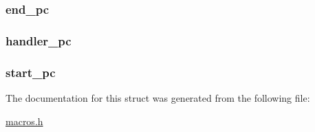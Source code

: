 \subsubsection[{end\+\_\+pc}]{ end\+\_\+pc}\label{struct_exception_for_code_a9c136439106544c4d1c986316d6d5fa2}
\hypertarget{struct_exception_for_code_a69a19b4db26dd1a8341f02051cb221a7}{}
\subsubsection[{handler\+\_\+pc}]{ handler\+\_\+pc}\label{struct_exception_for_code_a69a19b4db26dd1a8341f02051cb221a7}
\hypertarget{struct_exception_for_code_a3ded0b47a89e0816c20dc577a82a1cd5}{}
\subsubsection[{start\+\_\+pc}]{ start\+\_\+pc}\label{struct_exception_for_code_a3ded0b47a89e0816c20dc577a82a1cd5}


The documentation for this struct was generated from the following file\+:\begin{DoxyCompactItemize}
\item 
\hyperlink{macros_8h}{macros.\+h}\end{DoxyCompactItemize}
